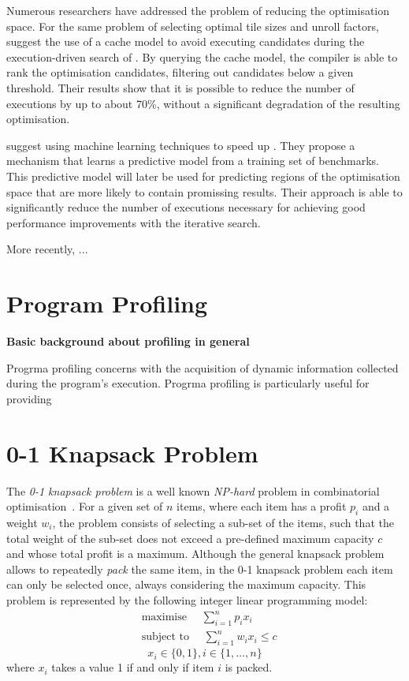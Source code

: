 Numerous researchers have addressed the problem of reducing the optimisation space.
For the same problem of selecting optimal tile sizes and unroll factors, \cite{knijnenburg04} suggest the use of a cache model to avoid executing candidates during the execution-driven search of {\itercomp}.
By querying the cache model, the compiler is able to rank the optimisation candidates, filtering out candidates below a given threshold.
Their results show that it is possible to reduce the number of executions by up to about 70\%, without a significant degradation of the resulting optimisation.

\cite{agakov06} suggest using machine learning techniques to speed up {\itercomp}.
They propose a mechanism that learns a predictive model from a training set of benchmarks.
This predictive model will later be used for predicting regions of the optimisation space that are more likely to contain promissing results.
Their approach is able to significantly reduce the number of executions necessary for achieving good performance improvements with the iterative search.

More recently, \cite{ogilvie17}...

\section{Program Profiling}

\textbf{Basic background about profiling in general}

Progrma profiling concerns with the acquisition of dynamic information collected during the program's execution.
Progrma profiling is particularly useful for providing 

\section{0-1 Knapsack Problem}

The \textit{0-1 knapsack problem} is a well known \textit{NP-hard} problem in combinatorial optimisation~\cite{martello00}.
For a given set of $n$ items, where each item has a profit $p_i$ and a weight $w_i$, the problem consists of selecting a sub-set of the items, such that the total weight of the sub-set does not exceed a pre-defined maximum capacity $c$ and whose total profit is a maximum.
Although the general knapsack problem allows to repeatedly \textit{pack} the same item, in the 0-1 knapsack problem each item can only be selected once, always considering the maximum capacity.
This problem is represented by the following integer linear programming model:
\begin{equation*}
\begin{aligned}
& \textrm{maximise }\quad \sum_{i=1}^{n} p_ix_i \\
& \textrm{subject to }\quad \sum_{i=1}^{n} w_ix_i \leq c
\end{aligned}
\end{equation*}
\[
x_i\in\{0,1\}, i\in\{1,\ldots,n\}
\]
where $x_i$ takes a value 1 if and only if item $i$ is packed.

